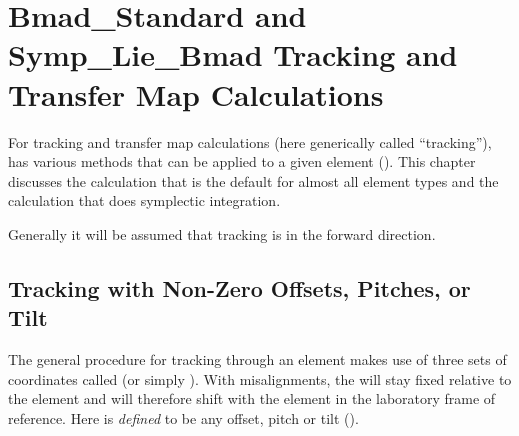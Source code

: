 \chapter[Tracking and Transfer Map Calculations]
{Bmad\_Standard and Symp\_Lie\_Bmad Tracking and Transfer Map Calculations}
\label{c:bmad.std}

For tracking and transfer map calculations (here generically called
``tracking''), \bmad has various methods that can be applied to a
given element (). This chapter discusses the
 calculation that is the default for almost all
element types and the  calculation that does
symplectic integration.

Generally it will be assumed that tracking is in the forward direction.

\section{Tracking with Non-Zero Offsets, Pitches, or Tilt}
\label{s:misalign.track}

The general procedure for tracking through an element makes use of
three sets of coordinates called  (or simply ).  With
misalignments, the  will stay fixed relative
to the element and will therefore shift with the element in the
laboratory frame of reference.  Here  is {\em
defined} to be any offset, pitch or tilt ().

